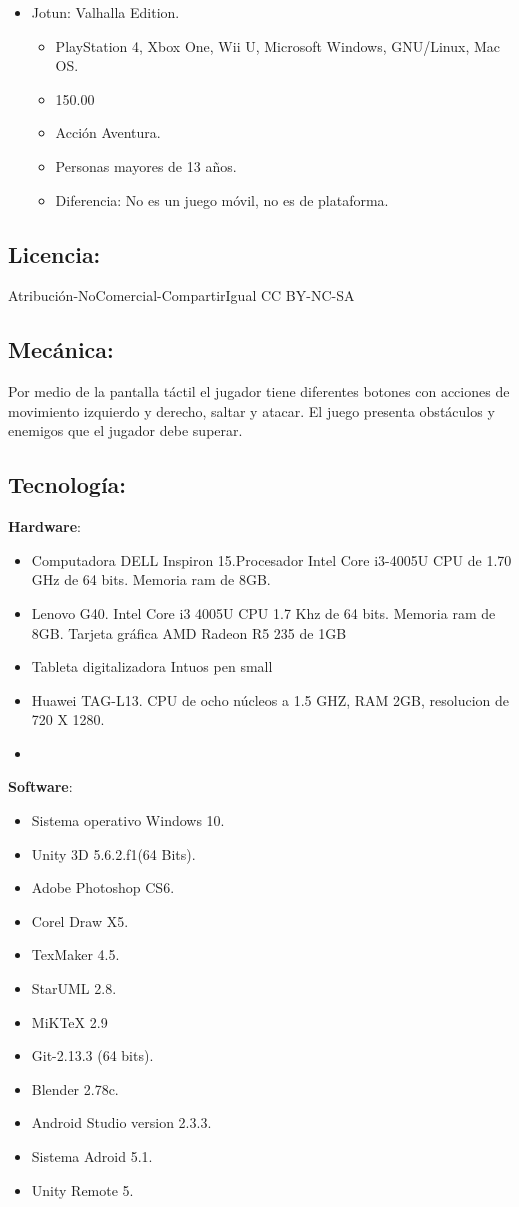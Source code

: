 \documentclass[11pt,letterpaper]{article}
\begin{document}
\begin{itemize}
\item Jotun: Valhalla Edition.
\begin{itemize}
	\item PlayStation 4, Xbox One, Wii U, Microsoft Windows, GNU/Linux, Mac OS.
	\item 150.00
	\item Acción Aventura.
	\item Personas mayores de 13 años.
	\item Diferencia: No es un juego móvil, no es de plataforma.
\end{itemize}

\end{itemize}

	\subsection{Licencia:}
Atribución-NoComercial-CompartirIgual 
CC BY-NC-SA
	\subsection{Mecánica:}
	Por medio de la pantalla táctil el jugador tiene diferentes botones con acciones de movimiento izquierdo y derecho, saltar y atacar.
	El juego presenta obstáculos y enemigos que el jugador debe superar.
	\subsection{Tecnología:}
\textbf{Hardware}:
\begin{itemize}
	\item Computadora DELL Inspiron 15.Procesador Intel Core i3-4005U CPU de 1.70 GHz de 64 bits. Memoria ram de 8GB.
	\item Lenovo G40. Intel Core i3 4005U CPU 1.7 Khz de 64 bits. Memoria ram de 8GB. Tarjeta gráfica AMD Radeon R5 235 de 1GB
	\item Tableta digitalizadora Intuos pen small
	\item Huawei TAG-L13. CPU de ocho núcleos a 1.5 GHZ, RAM 2GB, resolucion de 720 X 1280.
	\item   
\end{itemize}
\textbf{Software}:
\begin{itemize}
	\item Sistema operativo Windows 10.
	\item Unity 3D 5.6.2.f1(64 Bits).
	\item Adobe Photoshop CS6.
	\item Corel Draw X5.
	\item TexMaker 4.5.
	\item StarUML 2.8.
	\item MiKTeX 2.9
	\item Git-2.13.3 (64 bits).
	\item Blender 2.78c.
	\item Android Studio version 2.3.3.
	\item Sistema Adroid 5.1.
	\item Unity Remote 5.
	
\end{itemize}		
\end{document}
